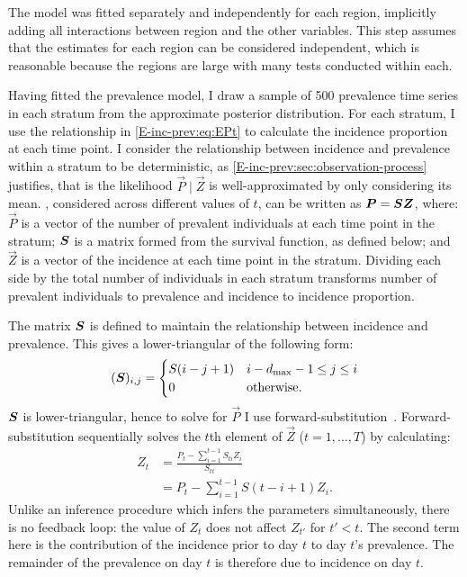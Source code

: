 \documentclass[thesis.tex]{subfiles}
\begin{document}
The model was fitted separately and independently for each region, implicitly adding all interactions between region and the other variables.
This step assumes that the estimates for each region can be considered independent, which is reasonable because the regions are large with many tests conducted within each.

Having fitted the prevalence model, I draw a sample of 500 prevalence time series in each stratum from the approximate posterior distribution.
For each stratum, I use the relationship in \cref{E-inc-prev:eq:EPt} to calculate the incidence proportion at each time point.
I consider the relationship between incidence and prevalence within a stratum to be deterministic, as \cref{E-inc-prev:sec:observation-process} justifies, that is the likelihood $\vec{P} \mid \vec{Z}$ is well-approximated by only considering its mean.
, considered across different values of $t$, can be written as $\bm{P} = \bm{S} \bm{Z}$, where: $\vec{P}$ is a vector of the number of prevalent individuals at each time point in the stratum; $\bm{S}$ is a matrix formed from the survival function, as defined below; and $\vec{Z}$ is a vector of the incidence at each time point in the stratum.
Dividing each side by the total number of individuals in each stratum transforms number of prevalent individuals to prevalence and incidence to incidence proportion.

The matrix $\bm{S}$ is defined to maintain the relationship between incidence and prevalence.
This gives a lower-triangular of the following form:
\begin{align}
    (\bm{S})_{i,j} = \begin{cases}
        S(i - j + 1) & i - d_\text{max} - 1 \leq j \leq i \\
        0 & \text{otherwise.}
    \end{cases}
\end{align}
$\bm{S}$ is lower-triangular, hence to solve for $\vec{P}$ I use forward-substitution~\autocite{cormenMatrix}.
Forward-substitution sequentially solves the $t$th element of $\vec{Z}$ ($t = 1, \dots, T$) by calculating:
\begin{align}
Z_t
&= \frac{P_t - \sum_{i=1}^{t-1} S_{ti} Z_i}{S_{tt}} \\
&= P_t - \sum_{i=1}^{t-1} S(t - i + 1) Z_i.
\label{transmission:eq:forward-substitute}
\end{align}
Unlike an inference procedure which infers the parameters simultaneously, there is no feedback loop: the value of $Z_{t}$ does not affect $Z_{t'}$ for $t' < t$.
The second term here is the contribution of the incidence prior to day $t$ to day $t$'s prevalence.
The remainder of the prevalence on day $t$ is therefore due to incidence on day $t$.
\end{document}
